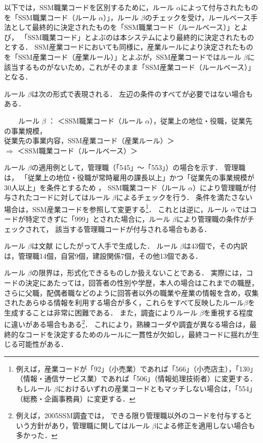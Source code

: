 \documentclass[japanese]{jnlp_1.4}
\begin{document}
以下では，SSM職業コードを区別するために，ルール $\alpha$によって付与されたものを「SSM職業コード（ルール $\alpha$）」，ルール $\beta$のチェックを受け，ルールベース手法として最終的に決定されたものを「SSM職業コード（ルールベース）」とよび，   「SSM職業コード」とよぶのは本システムにより最終的に決定されたものとする．
 SSM産業コードにおいても同様に，産業ルールにより決定されたものを「SSM産業コード（産業ルール）」とよぶが，SSM産業コードではルール $\beta$に該当するものがないため，これがそのまま「SSM産業コード（ルールベース）」となる．

ルール $\beta$は次の形式で表現される．
左辺の条件のすべてが必要ではない場合もある．

\vspace{1\Cvs}
　　ルール $\beta$ ： ＜SSM職業コード（ルール $\alpha$），従業上の地位・役職，従業先の事業規模，\\
\qquad\qquad\qquad\qquad\quad  従業先の事業内容，SSM産業コード（産業ルール）＞\\
\qquad\qquad\qquad\qquad\quad   $\Rightarrow$ ＜SSM職業コード（ルールベース）＞
\vspace{1\Cvs}

ルール $\beta$の適用例として，管理職（「545」〜「553」）の場合を示す．
管理職は， 「従業上の地位・役職が常時雇用の課長以上」かつ「従業先の事業規模が30人以上」を条件とするため \cite{SSM96}， SSM職業コード（ルール $\alpha$）により管理職が付与されたコードに対してはルール $\beta$によるチェックを行う．
条件を満たさない場合は，SSM産業コードを参照して変更する\footnote{例えば，産業コードが「92」（小売業）であれば「566」（小売店主），「130」（情報・通信サービス業）であれば「506」（情報処理技術者）に変更する．もしルール $\beta$におけるいずれの産業コードともマッチしない場合は，「554」（総務・企画事務員）に変更する．}．
これとは逆に，ルール $\alpha$ではコードが特定できずに「999」とされた場合に，ルール $\beta$により管理職の条件がチェックされて， 該当する管理職コードが付与される場合もある．

ルール $\beta$は文献 \cite{SSM96}にしたがって人手で生成した．
ルール $\beta$は43個で，その内訳は，管理職14個，自営9個，建設関係7個，その他13個である．

ルール $\beta$の限界は，形式化できるものしか扱えないことである．
実際には，コードの決定にあたっては，回答者の性別や学歴，本人の場合はこれまでの職歴，さらに父職，配偶者職などのように回答者以外の職業や産業の情報を含め，収集されたあらゆる情報を利用する場合が多く，これらをすべて反映したルール$\beta$を生成することは非常に困難である．
また，調査によりルール $\beta$を重視する程度に違いがある場合もある\footnote{例えば，2005SSM調査では， できる限り管理職以外のコードを付与するという方針があり，管理職に関してはルール $\beta$による修正を適用しない場合も多かった．}．
これにより，熟練コーダや調査が異なる場合は，最終的なコードを決定するためのルールに一貫性が欠如し，最終コードに揺れが生じる可能性がある．  
\end{document}
